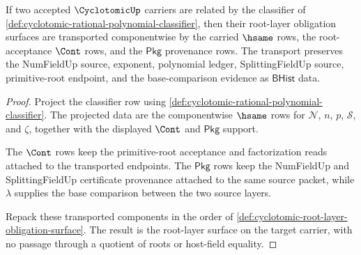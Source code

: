 \begin{theorem}
\label{thm:cyclotomic-root-layer-classifier-transport}
If two accepted $\CyclotomicUp$ carriers are related by the classifier of
\autoref{def:cyclotomic-rational-polynomial-classifier}, then their
root-layer obligation surfaces are transported componentwise by the carried
$\hsame$ rows, the root-acceptance $\Cont$ rows, and the $\mathsf{Pkg}$
provenance rows. The transport preserves the NumFieldUp source, exponent,
polynomial ledger, SplittingFieldUp source, primitive-root endpoint, and the
base-comparison evidence as $\mathsf{BHist}$ data.
\end{theorem}
\begin{proof}
Project the classifier row using
\autoref{def:cyclotomic-rational-polynomial-classifier}. The projected data are
the componentwise $\hsame$ rows for $\mathcal{N}$, $n$, $p$, $\mathcal{S}$, and
$\zeta$, together with the displayed $\Cont$ and $\mathsf{Pkg}$ support.

The $\Cont$ rows keep the primitive-root acceptance and factorization reads
attached to the transported endpoints. The $\mathsf{Pkg}$ rows keep the
NumFieldUp and SplittingFieldUp certificate provenance attached to the same
source packet, while $\lambda$ supplies the base comparison between the two
source layers.

Repack these transported components in the order of
\autoref{def:cyclotomic-root-layer-obligation-surface}. The result is the
root-layer surface on the target carrier, with no passage through a quotient of
roots or host-field equality.
\end{proof}

